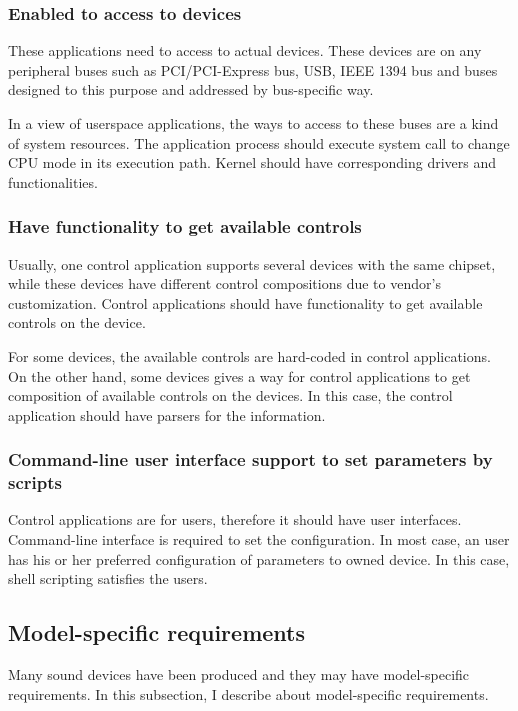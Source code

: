 \documentclass[onecolumn]{article}
\begin{document}
\subsubsection{Enabled to access to devices}

These applications need to access to actual devices. These devices are on any peripheral buses such as PCI/PCI-Express bus, USB, IEEE 1394 bus and buses designed to this purpose and addressed by bus-specific way.

In a view of userspace applications, the ways to access to these buses are a kind of system resources. The application process should execute system call to change CPU mode in its execution path. Kernel should have corresponding drivers and functionalities.


\subsubsection{Have functionality to get available controls}

Usually, one control application supports several devices with the same chipset, while these devices have different control compositions due to vendor's customization. Control applications should have functionality to get available controls on the device.

For some devices, the available controls are hard-coded in control applications. On the other hand, some devices gives a way for control applications to get composition of available controls on the devices. In this case, the control application should have parsers for the information.


\subsubsection{Command-line user interface support to set parameters by scripts}

Control applications are for users, therefore it should have user interfaces. Command-line interface is required to set the configuration. In most case, an user has his or her preferred configuration of parameters to owned device. In this case, shell scripting satisfies the users.


\subsection{Model-specific requirements}

Many sound devices have been produced and they may have model-specific requirements. In this subsection, I describe about model-specific requirements.
\end{document}
